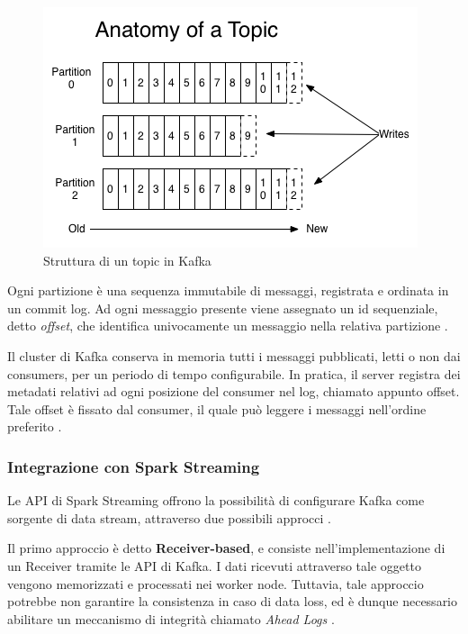 \documentclass[12pt]{article}
\begin{document}
\begin{figure}[H]
	\centering
	\includegraphics[scale=0.80]{images/log_anatomy.png}
	\caption{Struttura di un topic in Kafka \cite{kafka}}
	\label{kafka-topic}
\end{figure}

Ogni partizione è una sequenza immutabile di messaggi, registrata e ordinata in un commit log. Ad ogni messaggio presente viene assegnato un id sequenziale, detto \textit{offset}, che identifica univocamente un messaggio nella relativa partizione \cite{kafka}.

Il cluster di Kafka conserva in memoria tutti i messaggi pubblicati, letti o non dai consumers, per un periodo di tempo configurabile. In pratica, il server registra dei metadati relativi ad ogni posizione del consumer nel log, chiamato appunto offset. Tale offset è fissato dal consumer, il quale può leggere i messaggi nell'ordine preferito \cite{kafka}. 


\subsubsection{Integrazione con Spark Streaming}

Le API di Spark Streaming offrono la possibilità di configurare Kafka come sorgente di data stream, attraverso due possibili approcci \cite{spark}. 

Il primo approccio è detto \textbf{Receiver-based}, e consiste nell'implementazione di un Receiver tramite le API di Kafka. I dati ricevuti attraverso tale oggetto vengono memorizzati e processati nei worker node. Tuttavia, tale approccio potrebbe non garantire la consistenza in caso di data loss, ed è dunque necessario abilitare un meccanismo di integrità chiamato \textit{Ahead Logs} \cite{spark}. \\
\end{document}
